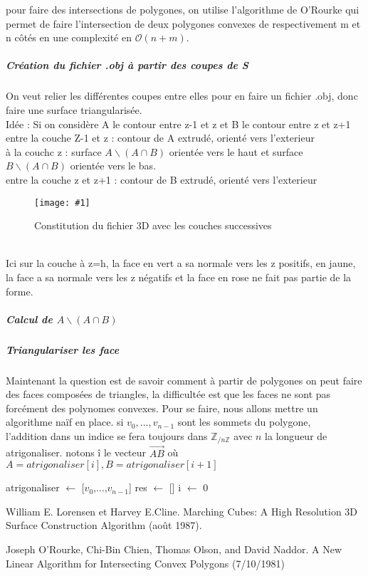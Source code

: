 \documentclass{article}
\newcommand*{\unefiguregraphic}[2]{\begin{figure}[!h] \centering \texttt{[image: \#1]} \caption{#2} \end{figure}}
\begin{document}
pour faire des intersections de polygones, on utilise l'algorithme
de O'Rourke \cite{key-1} qui permet de faire l'intersection de deux
polygones convexes de respectivement m et n côtés en une complexité
en $\mathcal{O}(n+m)$.

\subparagraph{Création du fichier .obj à partir des coupes de S}

On veut relier les différentes coupes entre elles pour en faire un
fichier .obj, donc faire une surface triangularisée.\\
Idée : Si on considère A le contour entre z-1 et z et B le contour entre z et z+1\\
entre la couche Z-1 et z : contour de A extrudé, orienté vers l'exterieur\\
à la couchc z : surface $A\backslash (A\cap B)$ orientée vers le haut et surface $B\backslash (A\cap B)$ orientée vers le bas.\\
entre la couche z et z+1 : contour de B extrudé, orienté vers l'exterieur\\
\unefiguregraphic{15}{Constitution du fichier 3D avec les couches successives}\\
Ici sur la couche à z=h, la face en vert a sa normale vers les z positifs, en jaune,
 la face a sa normale vers les z n\'egatifs et la face en rose ne fait pas partie de la forme.
\subparagraph{Calcul de $A\backslash (A\cap B)$}

\subparagraph{Triangulariser les face}

Maintenant la question est de  savoir comment à partir de polygones on peut faire des faces composées de triangles,
la difficult\'ee est que les faces ne sont pas forc\'ement des polynomes convexes.
Pour se faire, nous allons mettre un algorithme naïf en place.
si $v_0,...,v_{n-1}$ sont les sommets du polygone,\\

l'addition dans un indice se fera toujours dans $\mathbb{Z}_{/n\mathbb{Z}}$ avec $n$ la longueur de atrigonaliser.
notons \^i le vecteur $\overrightarrow{AB}$ o\`u $A = atrigonaliser[i], B=atrigonaliser[i+1]$
\begin{algorithm}
atrigonaliser $\leftarrow$ [$v_0$,...,$v_{n-1}$]\;
res $\leftarrow$ []\;
i $\leftarrow$ 0\;
\end{algorithm}
 
 
\listoffigures
\begin{thebibliography}{1}
    William E. Lorensen et Harvey E.Cline. Marching Cubes:
    A High Resolution 3D Surface Construction Algorithm (août 1987).
    
    Joseph O\textquoteright Rourke, Chi-Bin Chien, Thomas
    Olson, and David Naddor. A New Linear Algorithm for Intersecting Convex
    Polygons (7/10/1981)
\end{thebibliography}
\end{document}
